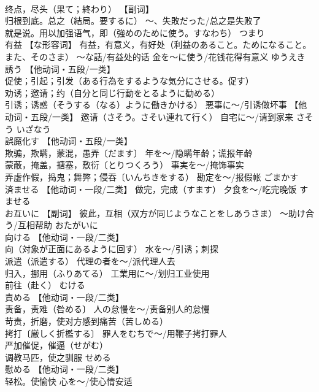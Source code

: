 \documentclass[8pt]{extreport}
\begin{document}
\begin{CJK}{UTF8}{min}
\\	终点，尽头（果て；終わり） 【副词】 
\\	归根到底。总之（結局。要するに） ～、失敗だった/总之是失败了 
\\	就是说。用以加强语气，即（強めのために使う。すなわち）	つまり	
\\	有益	【な形容词】 有益，有意义，有好处（利益のあること。ためになること。また、そのさま） ～な話/有益处的话 金を～に使う/花钱花得有意义	ゆうえき	
\\	誘う	【他动词・五段/一类】 
\\	促使；引起；引发（ある行為をするような気分にさせる。促す） 
\\	劝诱；邀请；约（自分と同じ行動をとるように勧める） 
\\	引诱；诱惑（そうする（なる）ように働きかける） 悪事に～/引诱做坏事 【他动词・五段/一类】 邀请（さそう。さそい連れて行く） 自宅に～/请到家来	さそう いざなう	
\\	誤魔化す	【他动词・五段/一类】 
\\	欺骗，欺瞒，蒙混，愚弄〔だます〕 年を～/隐瞒年龄；谎报年龄 
\\	蒙蔽，掩盖，搪塞，敷衍〔とりつくろう） 事実を～/掩饰事实 
\\	弄虚作假，捣鬼；舞弊；侵吞〔いんちきをする） 勘定を～/报假帐	ごまかす	
\\	済ませる	【他动词・一段/二类】 做完，完成（すます） 夕食を～/吃完晚饭	すませる	
\\	お互いに	【副词】 彼此，互相（双方が同じようなことをしあうさま） ～助け合う/互相帮助	おたがいに	
\\	向ける	【他动词・一段/二类】 
\\	向（対象が正面にあるように回す） 水を～/引诱；刺探 
\\	派遣（派遣する） 代理の者を～/派代理人去 
\\	归入，挪用（ふりあてる） 工業用に～/划归工业使用 
\\	前往（赴く）	むける	
\\	責める	【他动词・一段/二类】 
\\	责备，责难（咎める〕 人の怠慢を～/责备别人的怠慢 
\\	苛责，折磨，使对方感到痛苦（苦しめる） 
\\	拷打〔厳しく折檻する〕 罪人をむちで～/用鞭子拷打罪人 
\\	严加催促，催逼（せがむ） 
\\	调教马匹，使之驯服	せめる	
\\	慰める	【他动词・一段/二类】 
\\	轻松。使愉快 心を～/使心情安适 

\end{CJK}
\end{document}
